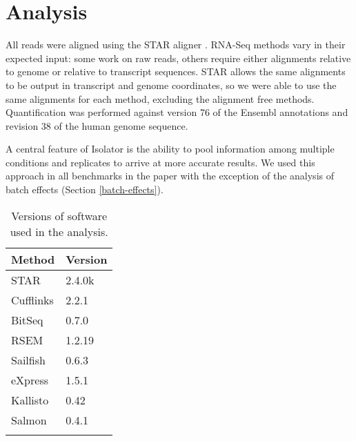 \documentclass{article}
\begin{document}
\section{Analysis}\label{analysis}

All reads were aligned using the STAR aligner \cite{Dobin:2013fg}. RNA-Seq
methods vary in their expected input: some work on raw reads, others require
either alignments relative to genome or relative to transcript sequences. STAR
allows the same alignments to be output in transcript and genome coordinates, so
we were able to use the same alignments for each method, excluding the alignment
free methods. Quantification was performed against version 76 of the Ensembl
annotations and revision 38 of the human genome sequence.

A central feature of Isolator is the ability to pool information among multiple
conditions and replicates to arrive at more accurate results. We used this
approach in all benchmarks in the paper with the exception of the analysis of
batch effects (Section \ref{batch-effects}).


\begin{table}
\begin{center}
\begin{tabular}[c]{ll}
\toprule\addlinespace
Method & Version \\
\midrule
STAR & 2.4.0k \\\addlinespace
Cufflinks & 2.2.1 \\\addlinespace
BitSeq & 0.7.0 \\\addlinespace
RSEM & 1.2.19 \\\addlinespace
Sailfish & 0.6.3 \\\addlinespace
eXpress & 1.5.1 \\\addlinespace
Kallisto & 0.42 \\\addlinespace
Salmon & 0.4.1 \\\addlinespace
\bottomrule
\addlinespace
\end{tabular}
\caption{Versions of software used in the analysis.}
\end{center}
\end{table}
\end{document}
